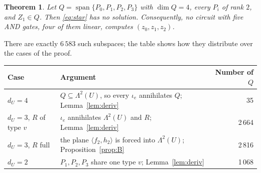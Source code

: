 \documentclass[11pt,a4paper]{article}
\theoremstyle{plain}
\newtheorem{theorem}{Theorem}
\theoremstyle{definition}
\theoremstyle{remark}
\newcommand{\Span}{\operatorname{span}}
\newcommand{\Lam}{\Lambda^{2}}
\newcommand{\dU}{d_U}
\begin{document}
\begin{theorem}\label{thm:main}
Let $Q=\Span\{P_0,P_1,P_2,P_3\}$ with $\dim Q=4$, every $P_i$ of rank $2$, and $Z_1\in Q$. Then \eqref{eq:star} has no solution. Consequently, no circuit with five AND gates, four of them linear, computes $(z_0,z_1,z_2)$.
\end{theorem}

There are exactly $6\,583$ such subspaces; the table shows how they distribute over the cases of the proof.

\begin{center}
\begin{tabularx}{0.95\textwidth}{@{}l X r@{}}
\toprule
Case & Argument & Number of $Q$ \\
\midrule
$\dU=4$ & $Q\subseteq\Lam(U)$, so every $\iota_e$ annihilates $Q$; Lemma~\ref{lem:deriv} & 35\\
$\dU=3$, $R$ of type $v$ & $\iota_e$ annihilates $\Lam(U)$ and $R$; Lemma~\ref{lem:deriv} & 2\,664\\
$\dU=3$, $R$ full & the plane $\langle f_2,h_2\rangle$ is forced into $\Lam(U)$; Proposition~\ref{prop:B} & 2\,816\\
$\dU=2$ & $P_1,P_2,P_3$ share one type $v$; Lemma~\ref{lem:deriv} & 1\,068\\
\bottomrule
\end{tabularx}
\end{center}
\end{document}
